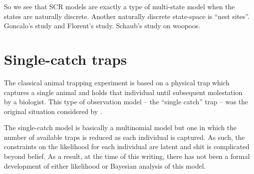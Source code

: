 So we see that SCR models are exactly a type of multi-state model when
the states are naturally discrete.  Another naturally discrete
state-space is ``nest sites''. Goncalo’s study and Florent’s
study. Schaub’s study on woopoos.

\section{Single-catch traps}
\label{poisson-mn.sec.singlecatch}

The classical animal trapping experiment is based on a physical trap
which captures a single animal and holds that individual until
subsequent molestation by a biologist. 
This type of observation model -- the ``single catch'' trap -- 
was the original situation considered by \citet{efford:2004}.

The single-catch model is basically a multinomial model but one in
which the number of available traps is reduced as each individual is
captured. As such, the constraints on the likelihood for each
individual are latent and shit is complicated beyond belief.
As a result, at the time of this writing, there has not been a formal
development of either likelihood  or Bayesian analysis of this model.

